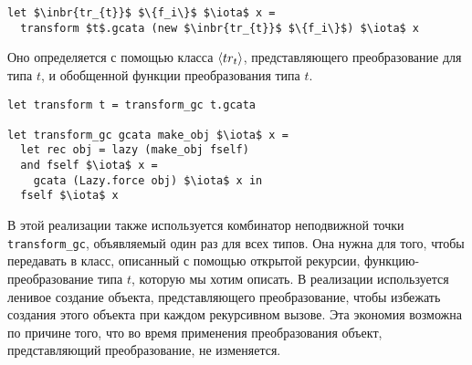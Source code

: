 \begin{lstlisting}
let $\inbr{tr_{t}}$ $\{f_i\}$ $\iota$ x =
  transform $t$.gcata (new $\inbr{tr_{t}}$ $\{f_i\}$) $\iota$ x
\end{lstlisting}
\noindent Оно определяется с помощью класса  $\left<tr_{t}\right>$, представляющего преобразование для типа $t$, и обобщенной функции преобразования типа $t$. 

\begin{lstlisting}
let transform t = transform_gc t.gcata

let transform_gc gcata make_obj $\iota$ x =
  let rec obj = lazy (make_obj fself)
  and fself $\iota$ x = 
    gcata (Lazy.force obj) $\iota$ x in
  fself $\iota$ x
\end{lstlisting}

В этой реализации также используется комбинатор неподвижной точки \lstinline{transform_gc}, объявляемый один раз для всех типов. Она нужна для того, чтобы передавать в класс, описанный с помощью открытой рекурсии, функцию-преобразование типа $t$, которую мы хотим описать. В реализации используется ленивое создание объекта, представляющего преобразование, чтобы избежать создания этого объекта при каждом рекурсивном вызове. Эта экономия возможна по причине того, что во время применения преобразования объект, представляющий преобразование, не изменяется.



%
%
%
%
%

